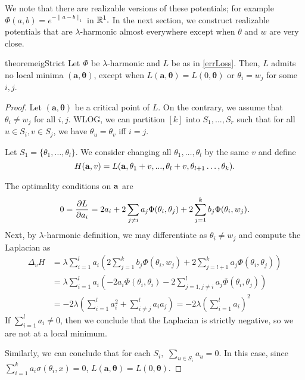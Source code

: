 We note that there are realizable versions of these potentials; for
example $\Phi(a,b) = e^{-\|a-b\|_1}$ in ${\mathbb{R}}^1.$
In the next section, we construct  realizable potentials that are 
$\lambda$-harmonic almost everywhere except when $\theta$ and $w$ are very close. 
%
\begin{restatable}{theorem}{eigStrict}
\label{EigStrict}
Let $\Phi$ be $\lambda$-harmonic and $L$ be as in \eqref{errLoss}. Then,
$L$ admits no local minima $\boldsymbol{(a,\theta)}$, except when
$L(\boldsymbol{a,\theta}) = L(0,\boldsymbol{\theta})$ or $\theta_i = w_j$ for some $i,j$. 
\end{restatable}
\begin{proof}
  Let $(\boldsymbol{a,\theta})$ be a critical point of $L.$ On the
  contrary, we assume that $\theta_i \neq w_j$ for all $i,j.$ WLOG, we
  can partition $[k]$ into $S_1,...,S_r$ such that for all $u \in S_i,
  v \in S_j$, we have $\theta_{u} = \theta_v$ iff $i=j$. 

Let $S_1 = \{ \theta_1, \ldots, \theta_{l}\}.$ 
We consider changing all
$\theta_1, \ldots, \theta_{l}$ by the same $v$ and define 
%
\[H({\bf a}, v) = L({\bf a},\theta_1+v,...,\theta_l+v, \theta_{l+1}
\ldots, \theta_k).\]

The optimality conditions on ${\bf a}$ are 
\begin{align*}
0 = \frac{\partial L}{\partial a_i} = 2a_i  + 2\sum_{j\neq i} a_j \Phi(\theta_i,\theta_j)
  + 2\sum_{j=1}^k b_j \Phi(\theta_i,w_j).
\end{align*}
%
Next, by $\lambda$-harmonic definition, we may differentiate as $\theta_i \neq w_j$ and compute the Laplacian as 
\begin{align*}
\Delta_v H & = \lambda\sum_{i=1}^l a_i \left(2\sum_{j=1}^k b_j
  \Phi(\theta_i, w_j) + 2\sum_{j=l+1}^k a_j
  \Phi(\theta_i, \theta_j)\right) \\
& = \lambda\sum_{i=1}^l a_i \left(-2a_i\Phi(\theta_i, \theta_i) - 2
  \sum_{j = 1, j\neq i}^l  a_j \Phi(\theta_i,\theta_j)\right) \\
%
%
& = -2\lambda\left(\sum_{i=1}^l a_i^2
  +\sum_{i \neq j}^l a_i a_j \right) = -2 \lambda\left(\sum_{i=1}^l a_i\right)^2
\end{align*} 
%
If $\sum_{i=1}^l a_i \neq 0$, then we conclude that the Laplacian is
strictly negative, so we are not at a local minimum. 

Similarly, we can conclude that for each $S_i,$ 
 $\sum_{u \in S_i} a_u = 0$. In this case, since $\sum_{i=1}^k a_i \sigma(\theta_i,x) = 0$, $L(\boldsymbol{a,\theta}) = L(0,\boldsymbol{\theta})$. 
\end{proof} 
